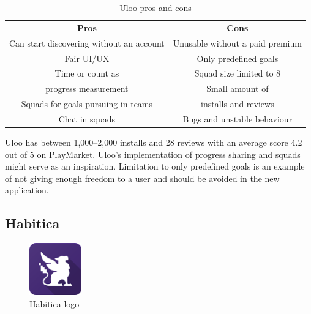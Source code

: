 \begin{table}[h!]
    \centering
    \begin{adjustbox}{width=\textwidth}
        \begin{ctucolortab}
            \begin{tabular}{cc}
                \bfseries Pros & \bfseries Cons\\\Midrule
                Can start discovering without an account & Unusable without a paid premium\\
                Fair UI/UX & Only predefined goals\\
                Time or count as & Squad size limited to 8\\
                progress measurement & Small amount of \\
                Squads for goals pursuing in teams & installs and reviews\\
                Chat in squads & Bugs and unstable behaviour\\
            \end{tabular}
        \end{ctucolortab}
    \end{adjustbox}
    \caption{Uloo pros and cons}\label{tab:uloo-pros-cons}
\end{table}

Uloo has between 1,000--2,000 installs and 28 reviews with an average score 4.2 out of 5 on PlayMarket.
Uloo's implementation of progress sharing and squads might serve as an inspiration.
Limitation to only predefined goals is an example of not giving enough freedom to a user and should be avoided in the new application.


\subsection{Habitica}\label{subsec:habitica}

\begin{figure}[h!]
    \includegraphics[width=0.20\textwidth]{images/habitica-logo.png}
    \caption{Habitica logo~\cite{habitica-logo}}
    \label{fig:habitica-logo}
\end{figure}

